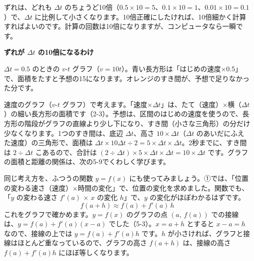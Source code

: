 \medskip
ずれは、どれも $\Delta t$ のちょうど10倍（$0.5\times10=5$、$0.1\times10=1$、$0.01\times10=0.1$）で、$\Delta t$ に比例して小さくなります。10倍正確にしたければ、10倍細かく計算すればよいのです。計算の回数は10倍になりますが、コンピュータなら一瞬です。

\begin{motto}[3]
\textbf{ずれが $\Delta t$ の10倍になるわけ}

\noindent\begin{minipage}[c]{0.4\linewidth}\centering
{}
\end{minipage}\hfill
\begin{minipage}[c]{0.56\linewidth}\raggedright
$\Delta t=0.5$ のときの $v$-$t$ グラフ（$v=10t$）。青い長方形は「はじめの速度×0.5」で、面積をたすと予想の15になります。オレンジのすき間が、予想で足りなかった分です。
\end{minipage}

\medskip
速度のグラフ（$v$-$t$ グラフ）で考えます。「速度×$\Delta t$」は、たて（速度）×横（$\Delta t$）の細い長方形の面積です（2-3）。予想は、区間のはじめの速度を使うので、長方形の階段がグラフの直線より少し下になり、すき間（小さな三角形）の分だけ少なくなります。1つのすき間は、底辺 $\Delta t$、高さ $10\times\Delta t$（$\Delta t$ のあいだにふえた速度）の三角形で、面積は $\Delta t\times10\Delta t\div2=5\times\Delta t\times\Delta t$。2秒までに、すき間は $2\div\Delta t$ こあるので、合計は $(2\div\Delta t)\times5\times\Delta t\times\Delta t=10\times\Delta t$ です。グラフの面積と距離の関係は、次の5-9でくわしく学びます。
\end{motto}


\label{bk:5-8:sessen}同じ考え方を、ふつうの関数 $y=f(x)$ にも使ってみましょう。①では、「位置の変わる速さ（速度）×時間の変化」で、位置の変化を求めました。関数でも、「$y$ の変わる速さ $f'(a)$ × $x$ の変化 $h$」で、$y$ の変化がほぼわかるはずです。
\[ f(a+h)\approx f(a)+f'(a)\,h \]
これをグラフで確かめます。$y=f(x)$ のグラフの点 $(a,\ f(a))$ での接線は、$y=f(a)+f'(a)(x-a)$ でした（5-3）。$x=a+h$ とすると $x-a=h$ なので、接線の上では $y=f(a)+f'(a)h$ です。$h$ が小さければ、グラフと接線はほとんど重なっているので、グラフの高さ $f(a+h)$ は、接線の高さ $f(a)+f'(a)h$ にほぼ等しくなります。

